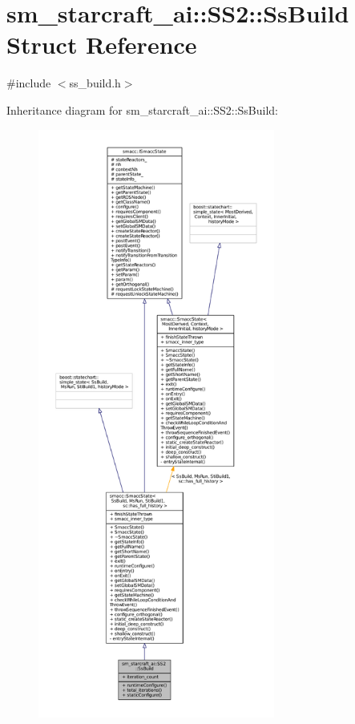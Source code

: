 \hypertarget{structsm__starcraft__ai_1_1SS2_1_1SsBuild}{}\section{sm\+\_\+starcraft\+\_\+ai\+:\+:S\+S2\+:\+:Ss\+Build Struct Reference}
\label{structsm__starcraft__ai_1_1SS2_1_1SsBuild}


{\ttfamily \#include $<$ss\+\_\+build.\+h$>$}



Inheritance diagram for sm\+\_\+starcraft\+\_\+ai\+:\+:S\+S2\+:\+:Ss\+Build\+:
\nopagebreak
\begin{figure}[H]
\begin{center}
\leavevmode
\includegraphics[height=550pt]{structsm__starcraft__ai_1_1SS2_1_1SsBuild__inherit__graph}
\end{center}
\end{figure}


